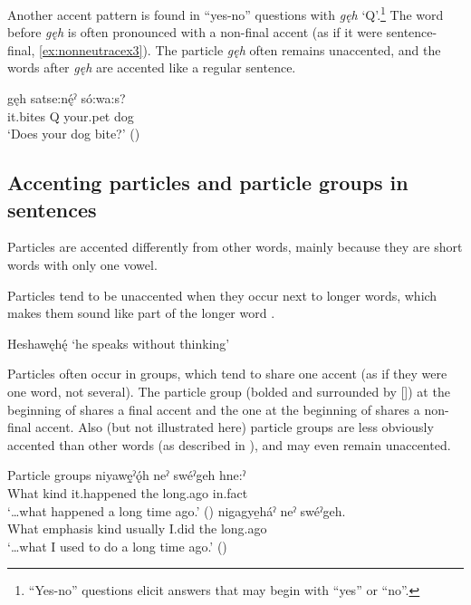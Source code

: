 \z
\z

Another accent pattern is found in “yes-no” questions with \textit{gęh} ‘Q’.\footnote{“Yes-no” questions elicit answers that may begin with “yes” or “no”.} The word before \textit{gęh} is often pronounced with a non-final accent (as if it were sentence-final, \ref{ex:nonneutracex3}). The particle  \textit{gęh} often remains unaccented, and the words after \textit{gęh} are accented like a regular sentence.

\ea\label{ex:nonneutracex3} 
\gll {} gęh satse:nę́ˀ só:wa:s? \\
it.bites  Q your.pet dog\\
\glt ‘Does your dog bite?’ (\cite[335]{mithun_watewayestanih_1984})
\z

\subsection{Accenting particles and particle groups in sentences} \label{ch:Accenting particles and particle groups in sentences}
Particles are accented differently from other words, mainly because they are short words with only one vowel.

Particles tend to be unaccented when they occur next to longer words, which makes them sound like part of the longer word . 

\ea\label{ex:partaccex}
Heshawęhę́  ‘he speaks without thinking’
\z


Particles often occur in groups, which tend to share one accent (as if they were one word, not several). The particle group (bolded and surrounded by []) at the beginning of  shares a final accent and the one at the beginning of  shares a non-final accent. Also (but not illustrated here) particle groups are less obviously accented than other words (as described in \cite{rueentan_prosody_2014}), and may even remain unaccented.

\ea\label{ex:partaccex2}  Particle groups
\ea\label{ex:partaccex2a} 
 niyawę̱ˀǫ́h neˀ swéˀgeh hne:ˀ\\
 What kind it.happened the long.ago in.fact\\
\glt ‘…what happened a long time ago.’ (\cite{henry_de_2005})
\ex\label{ex:partaccex2b}
 nigagye̱háˀ neˀ swéˀgeh.\\
 What emphasis kind usually  I.did  the long.ago \\
\glt ‘…what I used to do a long time ago.’ (\cite{henry_de_2005})
\z
\z


